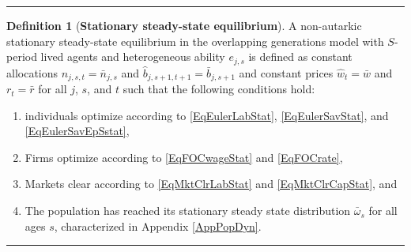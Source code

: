 \documentclass[letterpaper,12pt]{article}
\theoremstyle{definition}
\newtheorem{definition}{Definition} %
\begin{document}
    \hrule
    \begin{definition}[\textbf{Stationary steady-state equilibrium}]\label{DefEquilSS}
      A non-autarkic stationary steady-state equilibrium in the overlapping generations model with $S$-period lived agents and heterogeneous ability $e_{j,s}$ is defined as constant allocations $n_{j,s,t}=\bar{n}_{j,s}$ and $\hat{b}_{j,s+1,t+1}=\bar{b}_{j,s+1}$ and constant prices $\hat{w}_t=\bar{w}$ and $r_t=\bar{r}$ for all $j$, $s$, and $t$ such that the following conditions hold:
       \begin{enumerate}
          \item individuals optimize according to \eqref{EqEulerLabStat}, \eqref{EqEulerSavStat}, and \eqref{EqEulerSavEpSstat},
          \item Firms optimize according to \eqref{EqFOCwageStat} and \eqref{EqFOCrate},
          \item Markets clear according to \eqref{EqMktClrLabStat} and \eqref{EqMktClrCapStat}, and
          \item The population has reached its stationary steady state distribution $\bar{\omega}_s$ for all ages $s$, characterized in Appendix \ref{AppPopDyn}.
       \end{enumerate}
    \end{definition}
    \hrule
\end{document}
